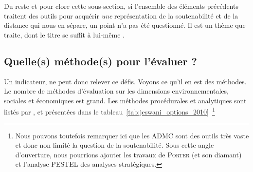 Du reste et pour clore cette sous-section, si l'ensemble des éléments précédents traitent des outils pour acquérir \textit{une} représentation de la soutenabilité et de la distance qui nous en sépare, un point n'a pas été questionné.
Il est un thème que \citeauthor{harribey_richesse_2013} traite, dont le titre se suffit à lui-même .

\subsection{Quelle(s) méthode(s) pour l'évaluer ?}
Un indicateur, ne peut donc relever ce défis.
Voyons ce qu'il en est des méthodes.
Le nombre de méthodes d'évaluation sur les dimensions environnementales, sociales et économiques est grand.
Les méthodes procédurales et analytiques sont listés par \citeauthor{jeswani_options_2010}, et présentées dans le tableau~\ref{tab:jeswani_options_2010}~\cite{jeswani_options_2010}\footnote{Nous pouvons toutefois remarquer ici que les \gls{ADMC} sont des outils très vaste et donc non limité la question de la soutenabilité.
Sous cette angle d'ouverture, nous pourrions ajouter les travaux de \textsc{Porter} (et son diamant) et l'analyse PESTEL des analyses stratégiques.}
